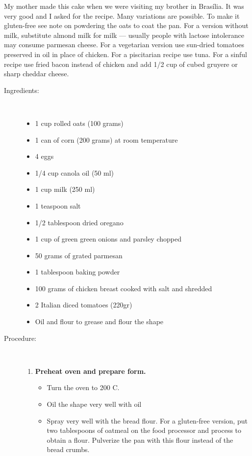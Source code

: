 \documentclass[11pt,letterpaper]{article}
\begin{document}



My mother made this cake when we were visiting my brother in Bras\'ilia. It was very good and I asked for the recipe. Many variations are possible. To make it gluten-free see note on powdering the oats to coat the pan. For a version without milk, substitute almond milk for milk --- usually people with lactose intolerance may consume parmesan cheese. For a vegetarian  version use sun-dried tomatoes preserved in oil in place of chicken. For a piscitarian recipe use tuna. For a sinful recipe use   fried bacon instead of chicken and add 1/2 cup of cubed gruyere or sharp cheddar cheese.
 
\begin {description}

\item [Ingredients:] \ \\
\begin {itemize}
\item 1 cup rolled oats (100 grams)
\item 1 can of corn (200 grams) at room temperature
\item 4 eggs
\item 1/4 cup canola oil (50 ml)
\item 1 cup milk (250 ml)
\item 1 teaspoon salt
\item 1/2 tablespoon dried oregano
\item 1 cup of green green onions and parsley chopped
\item 50 grams of grated parmesan
\item 1 tablespoon baking powder
\item 100 grams of chicken breast cooked with salt and shredded 
\item 2 Italian diced tomatoes (220gr)
\item Oil and flour to grease and flour the shape
\end {itemize}

\item [Procedure:] \ \\
\begin {enumerate}
\item {\bf Preheat oven and prepare form.}
\begin {itemize}
\item Turn the oven to 200 C.
\item Oil the shape very well with oil
\item Spray very well with the bread flour. For a gluten-free version, put two tablespoons of oatmeal on the food processor and process to obtain a flour. Pulverize the pan with this flour instead of the bread crumbs. 
\end {itemize}



\end{enumerate}
\end{description}
\end{document}
